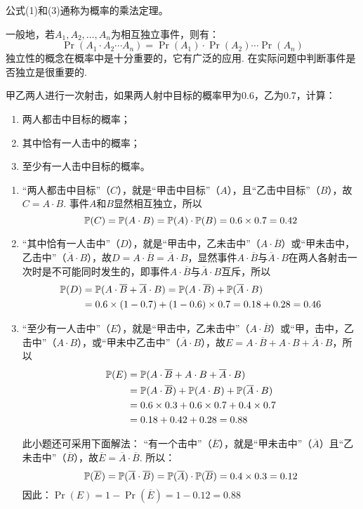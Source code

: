 公式(1)和(3)通称为概率的乘法定理。

一般地，若$A_1,A_2,\ldots,A_n$为相互独立事件，则有：
\begin{equation}
    \Pr(A_1\cdot A_2\cdots A_n)=\Pr(A_1)\cdot \Pr(A_2)\cdots \Pr(A_n)\tag{4}
\end{equation}
独立性的概念在概率中是十分重要的，它有广泛的应用. 在实际问题中判断事件是否独立是很重要的.

\begin{example}
    甲乙两人进行一次射击，如果两人射中目标的概率甲为0.6，乙为0.7，计算：
\begin{enumerate}[(1)]
\item 两人都击中目标的概率；
\item 其中恰有一人击中的概率；
\item 至少有一人击中目标的概率。
\end{enumerate}
\end{example}

\begin{solution}
\begin{enumerate}[(1)]
    \item “两人都击中目标”（$C$），就是“甲击中目标”（$A$），且“乙击中目标”（$B$），故$C=A\cdot B$. 事件$A$和$B$显然相互独立，所以
  \[  \mathbb{P}(C)=\mathbb{P}(A\cdot B)=\mathbb{P}(A)\cdot \mathbb{P}(B)=0.6\times0.7=0.42\]
    \item “其中恰有一人击中”（$D$），就是“甲击中，乙未击中”（$A\cdot \overline{B}$）或“甲未击中，乙击中”（$\overline{A}\cdot B$），故$D=A\cdot \overline{B}=\overline{A}\cdot B$，显然事件$A\cdot \overline{B}$与$\overline{A}\cdot B$在两人各射击一次时是不可能同时发生的，即事件$A\cdot \overline{B}$与$\overline{A}\cdot B$互斥，所以
\[\begin{split}
    \mathbb{P}(D)&=\mathbb{P}(A\cdot \overline{B}+\overline{A}\cdot B)=\mathbb{P}(A\cdot \overline{B})+\mathbb{P}(\overline{A}\cdot B)\\
    &=0.6\times(1-0.7)+(1-0.6)\times 0.7=0.18+0.28=0.46
\end{split}\]
    \item “至少有一人击中”（$E$），就是“甲击中，乙未击中”（$A\cdot \overline{B}$）或“甲，击中，乙击中”（${A}\cdot B$），或“甲未中乙击中”（$\overline{A}\cdot B$），故$E=A\cdot \overline{B}+A\cdot B+\overline{A}\cdot B$，所以
\[\begin{split}
    \mathbb{P}(E) &= \mathbb{P}(A\cdot \overline{B}+A\cdot B+\overline{A}\cdot B)\\
    &=\mathbb{P}(A\cdot \overline{B})+\mathbb{P}(A\cdot B)+\mathbb{P}(\overline{A}\cdot B)\\
    &=0.6\times0.3+0.6\times0.7+0.4\times0.7\\
&=0.18+0.42+0.28=0.88
\end{split}\]

此小题还可采用下面解法：
“有一个击中”（$\overline{E}$），就是“甲未击中”（$\overline{A}$）且“乙未击中”（$\overline{B}$），故$\overline{E}=\overline{A}\cdot \overline{B}$. 所以：
$$\mathbb{P}(\overline{E})=\mathbb{P}(\overline{A}\cdot \overline{B})=\mathbb{P}(\overline{A})\cdot\mathbb{P}(\overline{B})=0.4\times0.3=0.12$$
因此：$\Pr(E)=1-\Pr(\overline{E})=1-0.12=0.88$
\end{enumerate}
\end{solution}

